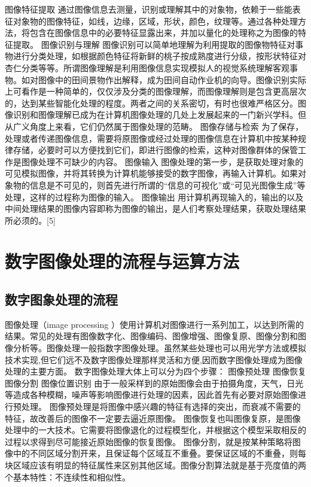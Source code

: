 \documentclass[18pt, twoside, a4paper, dvipdfm]{book}
\begin{document}
图像特征提取	 通过图像信息去测量，识别或理解其中的对象物，依赖于一些能表征对象物的图像特征，如线，边缘，区域，形状，颜色，纹理等。通过各种处理方法，将包含在图像信息中的必要特征显露出来，并加以量化的处理称之为图像的特征提取。
图像识别与理解 图像识别可以简单地理解为利用提取的图像物特征对事物进行分类处理，如根据颜色特征将新鲜的桃子按成熟度进行分级，按形状特征对杏仁分类等等。所谓图像理解是利用图像信息实现模拟人的视觉系统理解客观事物。如对图像中的田间景物作出解释，成为田间自动作业机的向导。图像识别实际上可看作是一种简单的，仅仅涉及分类的图像理解，而图像理解则是包含更高层次的，达到某些智能化处理的程度。两者之间的关系密切，有时也很难严格区分。图像识别和图像理解已成为在计算机图像处理的几处上发展起来的一门新兴学科。但从广义角度上来看，它们仍然属于图像处理的范畴。
图像存储与检索 为了保存，处理或者传递图像信息，需要将原图像或经过处理的图像信息在计算机中按某种规律存储，必要时可以方便找到它们，即进行图像的检索，这种对图像群体的保管工作是图像处理不可缺少的内容。
图像输入 图像处理的第一步，是获取处理对象的可见模拟图像，并将其转换为计算机能够接受的数字图像，再输入计算机。如果对象物的信息是不可见的，则首先进行所谓的“信息的可视化”或“可见光图像生成”等处理，这样的过程称为图像的输入。
图像输出 用计算机再现输入的，输出的以及中间处理结果的图像内容即称为图像的输出，是人们考察处理结果，获取处理结果所必须的。[5]

\section{数字图像处理的流程与运算方法}
\subsection{数字图象处理的流程}

图像处理（image processing ）使用计算机对图像进行一系列加工，以达到所需的结果。常见的处理有图像数字化、图像编码、图像增强、图像复原、图像分割和图像分析等。图像处理一般指数字图像处理。虽然某些处理也可以用光学方法或模拟技术实现,但它们远不及数字图像处理那样灵活和方便,因而数字图像处理成为图像处理的主要方面。
数字图像处理大体上可以分为四个步骤：
图像预处理
图像恢复
图像分割
图像位置识别
由于一般采样到的原始图像会由于拍摄角度，天气，日光等造成各种模糊，噪声等影响图像进行处理的因素，因此首先有必要对原始图像进行预处理。
图像预处理是将图像中感兴趣的特征有选择的突出，而衰减不需要的特征，故改善后的图像不一定要去逼近原图像。
图像恢复也叫图像复原，是图像处理中的一大技术。它需要将图像退化的过程模型化，并根据这个模型采取相反的过程以求得到尽可能接近原始图像的恢复图像。
图像分割，就是按某种策略将图像中的不同区域分割开来，且保证每个区域互不重叠。要保证区域的不重叠，则每块区域应该有明显的特征属性来区别其他区域。图像分割算法就是基于亮度值的两个基本特性：不连续性和相似性。
\end{document}
